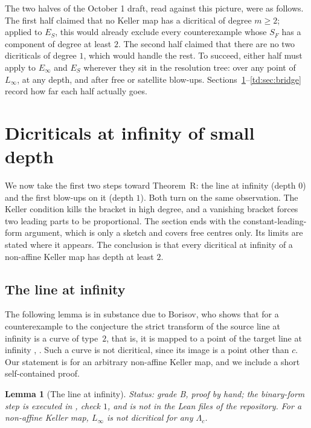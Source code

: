 \documentclass[a4paper,11pt]{article}
\newcommand{\filename}[1]{\texttt{\seqsplit{#1}}}
\theoremstyle{jsplain}
\newtheorem{lemma}[theorem]{Lemma}
\theoremstyle{jsdef}
\theoremstyle{jsrem}
\begin{document}
The two halves of the October 1 draft, read against this picture, were as follows. The first half
claimed that no Keller map has a dicritical of degree $m \geq 2$; applied to $E_S$, this would
already exclude every counterexample whose $S_F$ has a component of degree at least $2$. The
second half claimed that there are no two dicriticals of degree $1$, which would handle the rest.
To succeed, either half must apply to $E_\infty$ and $E_S$ wherever they sit in the resolution
tree: over any point of $L_\infty$, at any depth, and after free or satellite blow-ups.
Sections~\ref{td:sec:depth01}--\ref{td:sec:bridge} record how far each half actually goes.

\section{Dicriticals at infinity of small depth}\label{td:sec:depth01}

We now take the first two steps toward Theorem~R: the line at infinity (depth $0$) and the
first blow-ups on it (depth $1$). Both turn on the same observation. The Keller condition kills
the bracket in high degree, and a vanishing bracket forces two leading parts to be proportional.
The section ends with the constant-leading-form argument, which is only a sketch and covers free
centres only. Its limits are stated where it appears. The conclusion is that every dicritical at
infinity of a non-affine Keller map has depth at least $2$.

\subsection{The line at infinity}\label{td:sec:linf}

The following lemma is in substance due to Borisov, who shows that for a counterexample to the
conjecture the strict transform of the source line at infinity is a curve of type~$2$, that is,
it is mapped to a point of the target line at infinity \cite[Prop.~15]{Borisov2009},
\cite[Cor.~3.1]{Borisov2011}. Such a curve is not dicritical, since its image is a point other
than $c$. Our statement is for an arbitrary non-affine Keller map, and we include a short
self-contained proof.

\begin{lemma}[The line at infinity]\label{td:lem:linf}
\textit{Status: grade B, proof by hand; the binary-form step is executed in
\filename{base\_point\_at\_infinity\_check.py}, check $1$, and is not in the Lean files of the
repository.}
For a non-affine Keller map, $L_\infty$ is not dicritical for any $\Lambda_c$.
\end{lemma}
\end{document}
